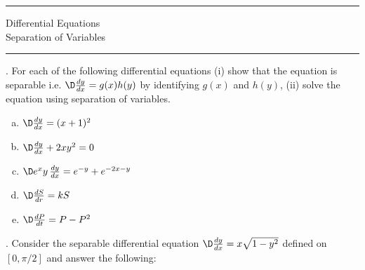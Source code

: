 \documentclass[12pt]{amsart}
\newcommand{\BACKROOT}{../../../..}
\newcommand{\TEACHINGROOT}{\BACKROOT}
\newcommand{\PATHTOHEADERS}{\TEACHINGROOT/Headers}
\numberwithin{equation}{section}
\begin{document}


\pagestyle{empty}

\noindent\rule{7.6in}{0.4pt}

{\centering\sc 
\noindent Differential Equations\\
 Separation of Variables \\
}
\noindent\rule{7.6in}{0.4pt}

\vspace{0.1cm}

. For each of the following differential equations (i) show that the equation is separable \Big{(}i.e. $\D \frac{dy}{dx} = g(x) h(y)$\Big{)} by identifying $g(x)$ and $h(y)$, (ii) solve the equation using separation of variables. 
\begin{enumerate}[(a)]
\item  $\D \frac{dy}{dx} = (x + 1)^2$ \\

\vfill

\item  $\D \frac{dy}{dx} + 2xy^2 = 0$ \\

\vfill

\newpage
\thispagestyle{empty}

	\item  $\D e^x y\, \frac{dy}{dx} = e^{-y} + e^{-2x-y}$\\

	\vfill

	\item  $\D \frac{dS}{dr} = kS$\\

	\vfill

\newpage
\thispagestyle{empty}

	\item  $\D \frac{dP}{dt} = P-P^2$\\

	\vfill

\end{enumerate}

\thispagestyle{empty}
\newpage
\thispagestyle{empty}

. Consider the separable differential equation $\D \frac{dy}{dx}=x\sqrt{1-y^2}$ defined on $[0,\pi/2]$ and answer the following: 
\end{document}
